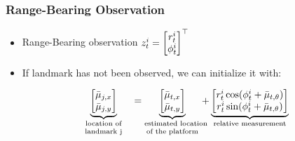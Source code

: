 \begin{frame}
    \frametitle{Range-Bearing Observation}

    \begin{itemize}
        \item Range-Bearing observation $z_t^i = \begin{bmatrix} r_t^i \\ \phi_t^i \end{bmatrix}^{\top}$
        
        \item If landmark has not been observed, we can initialize it with:
    \end{itemize}
    
    \begin{equation*}
        \underbrace{
        \begin{bmatrix}
        \bar{\mu}_{j,x} \\
        \bar{\mu}_{j,y}
        \end{bmatrix}}_{\parbox{2cm}{\centering \scriptsize \text{location of} \\ \text{landmark} j}}
        =
        \underbrace{
        \begin{bmatrix}
        \bar{\mu}_{t,x} \\
        \bar{\mu}_{t,y}
        \end{bmatrix}}_{\parbox{2cm}{\centering \scriptsize \text{estimated location} \\ \text{of the platform}}}
        +
        \underbrace{
        \begin{bmatrix}
        r_t^i \cos(\phi_t^i + \bar{\mu}_{t,\theta}) \\
        r_t^i \sin(\phi_t^i + \bar{\mu}_{t,\theta})
        \end{bmatrix}}_{\text{relative measurement}}
    \end{equation*}
\end{frame}

